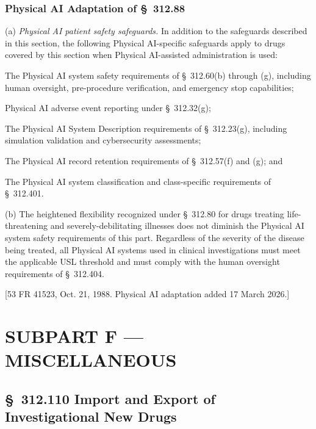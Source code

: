 \documentclass[11pt]{article}
\begin{document}
\subsubsection{Physical AI Adaptation of \S~312.88}

(a) \textit{Physical AI patient safety safeguards.} In addition to the safeguards described in this section, the following Physical AI-specific safeguards apply to drugs covered by this section when Physical AI-assisted administration is used:

\begin{description}[leftmargin=0.8cm,style=sameline]
\item[(i)] The Physical AI system safety requirements of \S~312.60(b) through (g), including human oversight, pre-procedure verification, and emergency stop capabilities;
\item[(ii)] Physical AI adverse event reporting under \S~312.32(g);
\item[(iii)] The Physical AI System Description requirements of \S~312.23(g), including simulation validation and cybersecurity assessments;
\item[(iv)] The Physical AI record retention requirements of \S~312.57(f) and (g); and
\item[(v)] The Physical AI system classification and class-specific requirements of \S~312.401.
\end{description}

(b) The heightened flexibility recognized under \S~312.80 for drugs treating life-threatening and severely-debilitating illnesses does not diminish the Physical AI system safety requirements of this part. Regardless of the severity of the disease being treated, all Physical AI systems used in clinical investigations must meet the applicable USL threshold and must comply with the human oversight requirements of \S~312.404.

[53 FR 41523, Oct. 21, 1988. Physical AI adaptation added 17 March 2026.]

\clearpage

\section{SUBPART F --- MISCELLANEOUS}

\subsection{\S~312.110 Import and Export of Investigational New Drugs}
\end{document}
